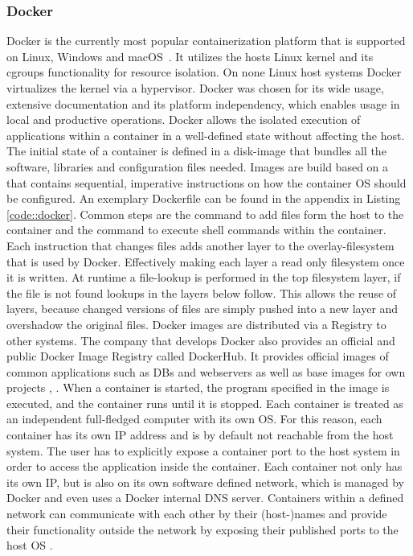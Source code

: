 \documentclass[12pt, a4paper]{article}
\begin{document}
        \subsubsection{Docker}
        Docker is the currently most popular containerization platform that is supported on Linux, Windows and macOS~\cite{docker_share}. It utilizes the hosts Linux kernel and its cgroups functionality for resource isolation. On none Linux host systems Docker virtualizes the kernel via a hypervisor. Docker was chosen for its wide usage, extensive documentation and its platform independency, which enables usage in local and productive operations.\newline
        Docker allows the isolated execution of applications within a container in a well-defined state without affecting the host. The initial state of a container is defined in a disk-image that bundles all the software, libraries and configuration files needed. Images are build based on a  that contains sequential, imperative instructions on how the container \ac{OS} should be configured. An exemplary Dockerfile can be found in the appendix in Listing \ref{code::docker}. Common steps are the  command to add files form the host to the container and the  command to execute shell commands within the container. Each instruction that changes files adds another layer to the overlay-filesystem that is used by Docker. Effectively making each layer a read only filesystem once it is written. At runtime a file-lookup is performed in the top filesystem layer, if the file is not found lookups in the layers below follow. This allows the reuse of layers, because changed versions of files are simply pushed into a new layer and overshadow the original files. Docker images are distributed via a Registry to other systems. The company that develops Docker also provides an official and public Docker Image Registry called DockerHub. It provides official images of common applications such as \acl{DB}s and webservers as well as base images for own projects \cite{docker2020}, \cite{dockerdocs}.\newline
        When a container is started, the program specified in the image is executed, and the container runs until it is stopped. Each container is treated as an independent full-fledged computer with its own \ac{OS}. For this reason, each container has its own \acs{IP} address and is by default not reachable from the host system. The user has to explicitly expose a container port to the host system in order to access the application inside the container. Each container not only has its own \acs{IP}, but is also on its own software defined network, which is managed by Docker and even uses a Docker internal \ac{DNS} server. Containers within a defined network can communicate with each other by their (host-)names and provide their functionality outside the network by exposing their published ports to the host \ac{OS} \cite{docker2020}.\newline
\end{document}
